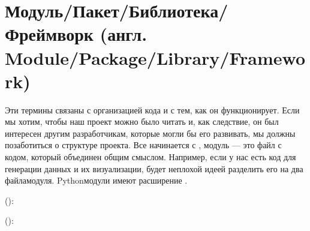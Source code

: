 \documentclass[letterpaper,10pt,russian]{sphinxmanual}
\begin{document}
\section{Модуль/Пакет/Библиотека/Фреймворк (англ. Module/Package/Library/Framework)}
\label{\detokenize{educational_materials/terms/content:module-package-library-framework}}
\sphinxAtStartPar
Эти термины связаны с организацией кода и с тем, как он функционирует. Если мы хотим, чтобы наш проект можно было читать и, как следствие, он был интересен другим разработчикам, которые могли бы его развивать, мы должны позаботиться о структуре проекта. Все начинается с , модуль — это файл с кодом, который объединен общим смыслом. Например, если у нас есть код для генерации данных и их визуализации, будет неплохой идеей разделить его на два файла\sphinxhyphen{}модуля.  Python\sphinxhyphen{}модули имеют расширение .

\sphinxAtStartPar
():

\begin{sphinxVerbatim}[commandchars=\\\{\}]
 
     
    
  
     \PYG{p}{[}    \PYG{p}{]}
\end{sphinxVerbatim}

\sphinxAtStartPar
():

\begin{sphinxVerbatim}[commandchars=\\\{\}]
   

 
    
 
      \PYG{p}{[}    \PYG{p}{]}
     
\end{sphinxVerbatim}
\end{document}
